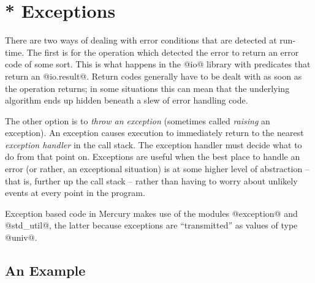 
\chapter{* Exceptions}

There are two ways of dealing with error conditions that are detected at
run-time.  The first is for the operation which detected the error to
return an error code of some sort.  This is what happens in the @io@
library with predicates that return an @io.result@.  Return codes
generally have to be dealt with as soon as the operation returns; in
some situations this can mean that the underlying algorithm ends up
hidden beneath a slew of error handling code.

The other option is to \emph{throw an exception} (sometimes called
\emph{raising} an exception).  An exception causes execution to
immediately return to the nearest \emph{exception handler} in the call
stack.  The exception handler must decide what to do from that point on.
Exceptions are useful when the best place to handle an error (or rather,
an exceptional situation) is at some higher level of abstraction -- that
is, further up the call stack -- rather than having to worry about
unlikely events at every point in the program.

Exception based code in Mercury makes use of the modules @exception@ and
@std_util@, the latter because exceptions are ``transmitted'' as values
of type @univ@.

\section{An Example}


